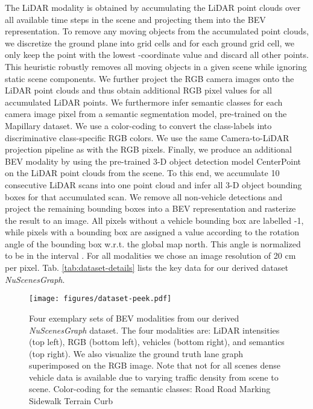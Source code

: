 \documentclass[letterpaper, 10 pt, conference]{ieeeconf}
\begin{document}
The LiDAR modality is obtained by accumulating the LiDAR point clouds over all available time steps in the scene and projecting them into the BEV representation. To remove any moving objects from the accumulated point clouds, we discretize the ground plane into grid cells and for each ground grid cell, we only keep the point with the lowest -coordinate value and discard all other points. This heuristic robustly removes all moving objects in a given scene while ignoring static scene components. We further project the RGB camera images onto the LiDAR point clouds and thus obtain additional RGB pixel values for all accumulated LiDAR points. We furthermore infer semantic classes for each camera image pixel from a semantic segmentation model, pre-trained on the Mapillary dataset. We use a color-coding to convert the class-labels into discriminative class-specific RGB colors. We use the same Camera-to-LiDAR projection pipeline as with the RGB pixels. Finally, we produce an additional BEV modality by using the pre-trained 3-D object detection model CenterPoint \cite{yin2020center} on the LiDAR point clouds from the scene. To this end, we accumulate 10 consecutive LiDAR scans into one point cloud and infer all 3-D object bounding boxes for that accumulated scan. We remove all non-vehicle detections and project the remaining bounding boxes into a BEV representation and rasterize the result to an image. All pixels without a vehicle bounding box are labelled -1, while pixels with a bounding box are assigned a value according to the rotation angle of the bounding box w.r.t. the global map north. This angle is normalized to be in the interval . For all modalities we chose an image resolution of 20 cm per pixel. Tab. \ref{tab:dataset-details} lists the key data for our derived dataset \textit{NuScenesGraph}.


\begin{figure}
\centering
\texttt{[image: figures/dataset-peek.pdf]}
\caption{Four exemplary sets of BEV modalities from our derived \textit{NuScenesGraph} dataset. The four modalities are: LiDAR intensities (top left), RGB (bottom left), vehicles (bottom right), and semantics (top right). We also visualize the ground truth lane graph superimposed on the RGB image. Note that not for all scenes dense vehicle data is available due to varying traffic density from scene to scene. Color-coding for the semantic classes: Road \quad Road Marking \quad Sidewalk \quad Terrain \quad Curb \quad}
\label{fig:dataset-peek}
\end{figure}
\end{document}
